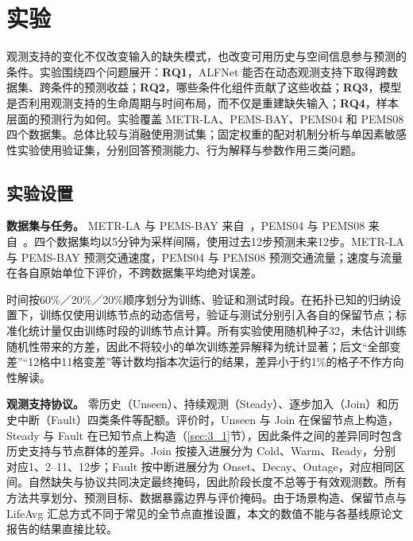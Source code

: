 \section{实验}\label{sec:exp}
观测支持的变化不仅改变输入的缺失模式，也改变可用历史与空间信息参与预测的条件。实验围绕四个问题展开：\textbf{RQ1}，ALFNet 能否在动态观测支持下取得跨数据集、跨条件的预测收益；\textbf{RQ2}，哪些条件化组件贡献了这些收益；\textbf{RQ3}，模型是否利用观测支持的生命周期与时间布局，而不仅是重建缺失输入；\textbf{RQ4}，样本层面的预测行为如何。实验覆盖 METR-LA、PEMS-BAY、PEMS04 和 PEMS08 四个数据集。总体比较与消融使用测试集；固定权重的配对机制分析与单因素敏感性实验使用验证集，分别回答预测能力、行为解释与参数作用三类问题。

\subsection{实验设置}\label{sec:4_1}

\textbf{数据集与任务。} METR-LA 与 PEMS-BAY 来自~\citep{li2018diffusion}，PEMS04 与 PEMS08 来自~\citep{guo2019attention}。四个数据集均以5分钟为采样间隔，使用过去12步预测未来12步。METR-LA 与 PEMS-BAY 预测交通速度，PEMS04 与 PEMS08 预测交通流量；速度与流量在各自原始单位下评价，不跨数据集平均绝对误差。

\begin{center}
\small
\resizebox{\linewidth}{!}{}
\end{center}

时间按60\%／20\%／20\%顺序划分为训练、验证和测试时段。在拓扑已知的归纳设置下，训练仅使用训练节点的动态信号，验证与测试分别引入各自的保留节点；标准化统计量仅由训练时段的训练节点计算。所有实验使用随机种子32，未估计训练随机性带来的方差，因此不将较小的单次训练差异解释为统计显著；后文“全部变差”“12格中11格变差”等计数均指本次运行的结果，差异小于约1\%的格子不作方向性解读。

\textbf{观测支持协议。} 零历史（Unseen）、持续观测（Steady）、逐步加入（Join）和历史中断（Fault）四类条件等配额。评价时，Unseen 与 Join 在保留节点上构造，Steady 与 Fault 在已知节点上构造（\ref{sec:3_1}节），因此条件之间的差异同时包含历史支持与节点群体的差异。Join 按接入进展分为 Cold、Warm、Ready，分别对应1、2–11、12步；Fault 按中断进展分为 Onset、Decay、Outage，对应相同区间。自然缺失与协议共同决定最终掩码，因此阶段长度不总等于有效观测数。所有方法共享划分、预测目标、数据暴露边界与评价掩码。由于场景构造、保留节点与 LifeAvg 汇总方式不同于常见的全节点直推设置，本文的数值不能与各基线原论文报告的结果直接比较。

